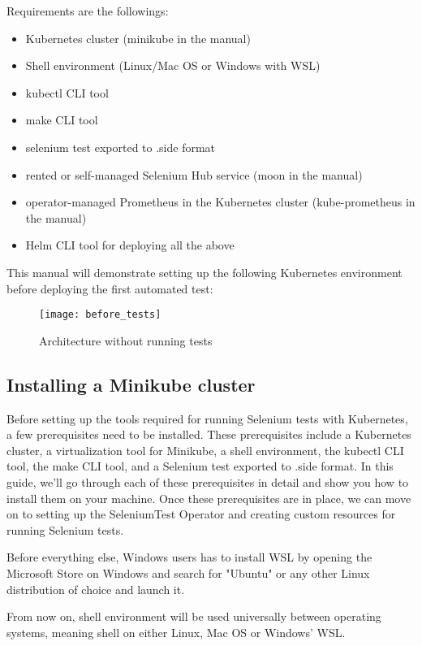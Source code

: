 Requirements are the followings:
\begin{itemize}
	\item Kubernetes cluster (minikube in the manual)
	\item Shell environment (Linux/Mac OS or Windows with WSL)
	\item kubectl CLI tool
	\item make CLI tool
	\item selenium test exported to .side format
	\item rented or self-managed Selenium Hub service (moon in the manual) 
	\item operator-managed Prometheus in the Kubernetes cluster (kube-prometheus in the manual)
	\item Helm CLI tool for deploying all the above
\end{itemize}

This manual will demonstrate setting up the following Kubernetes environment before deploying the first automated test:

\begin{figure}[H]
	\centering
	\texttt{[image: before\_tests]}
	\label{fig:before_tests}
	\caption{Architecture without running tests}
\end{figure}

\subsection{Installing a Minikube cluster}

Before setting up the tools required for running Selenium tests with Kubernetes, a few prerequisites need to be installed. These prerequisites include a Kubernetes cluster, a virtualization tool for Minikube, a shell environment, the kubectl CLI tool, the make CLI tool, and a Selenium test exported to .side format. In this guide, we'll go through each of these prerequisites in detail and show you how to install them on your machine. Once these prerequisites are in place, we can move on to setting up the SeleniumTest Operator and creating custom resources for running Selenium tests.

Before everything else, Windows users has to install WSL by opening the Microsoft Store on Windows and search for "Ubuntu" or any other Linux distribution of choice and launch it.

From now on, shell environment will be used universally between operating systems, meaning shell on either Linux, Mac OS or Windows' WSL.

